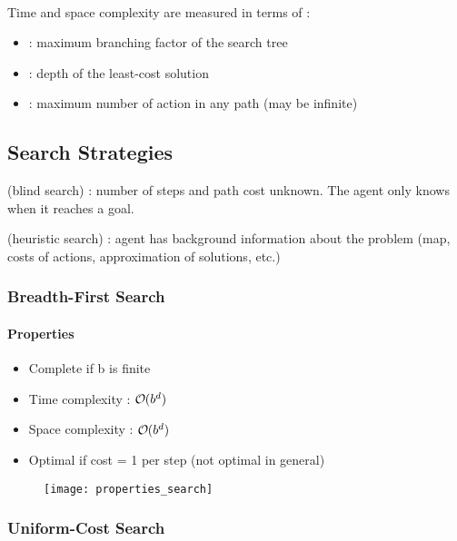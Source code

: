 \\
Time and space complexity are measured in terms of :
\begin{itemize}
\item {} : maximum branching factor of the search tree
\item {} : depth of the least-cost solution
\item {} : maximum number of action in any path (may be infinite)
\end{itemize}

\subsection{Search Strategies}

 (blind search) : number of steps and path cost unknown. The agent only knows when it reaches a goal.

 (heuristic search) : agent has background information about the problem (map, costs of actions, approximation of solutions, etc.)

\subsubsection{Breadth-First Search}

\paragraph{Properties}
\begin{minipage}{0.59\textwidth}
	\begin{itemize}
	\item Complete if b is finite
	\item Time complexity : $\bigO (b^d)$
	\item Space complexity : $\bigO (b^d)$
	\item Optimal if cost = 1 per step (not optimal in general)
	\end{itemize}
\end{minipage}
\begin{minipage}{0.4\textwidth}
	\begin{figure}[H]
		\centering
    		\texttt{[image: properties\_search]}
	\end{figure}
\end{minipage}

\subsubsection{Uniform-Cost Search}

